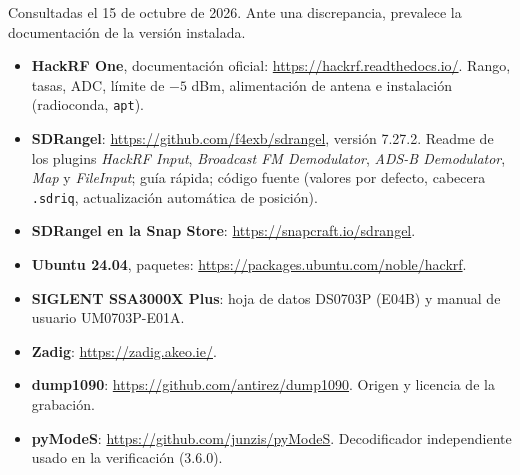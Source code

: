 Consultadas el 15 de octubre de 2026. Ante una discrepancia, prevalece la documentación de la versión instalada.

\begin{itemize}[itemsep=0.35em]
  \item \textbf{HackRF One}, documentación oficial: \url{https://hackrf.readthedocs.io/}. Rango, tasas, ADC, límite de $-5$ dBm, alimentación de antena e instalación (radioconda, \texttt{apt}).
  \item \textbf{SDRangel}: \url{https://github.com/f4exb/sdrangel}, versión 7.27.2. Readme de los plugins \emph{HackRF Input}, \emph{Broadcast FM Demodulator}, \emph{ADS-B Demodulator}, \emph{Map} y \emph{FileInput}; guía rápida; código fuente (valores por defecto, cabecera \texttt{.sdriq}, actualización automática de posición).
  \item \textbf{SDRangel en la Snap Store}: \url{https://snapcraft.io/sdrangel}.
  \item \textbf{Ubuntu 24.04}, paquetes: \url{https://packages.ubuntu.com/noble/hackrf}.
  \item \textbf{SIGLENT SSA3000X Plus}: hoja de datos DS0703P (E04B) y manual de usuario UM0703P-E01A.
  \item \textbf{Zadig}: \url{https://zadig.akeo.ie/}.
  \item \textbf{dump1090}: \url{https://github.com/antirez/dump1090}. Origen y licencia de la grabación.
  \item \textbf{pyModeS}: \url{https://github.com/junzis/pyModeS}. Decodificador independiente usado en la verificación (3.6.0).
\end{itemize}
